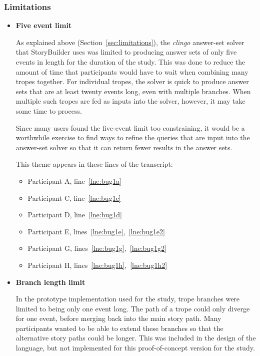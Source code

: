 \documentclass[11pt]{report}
\newcommand{\lref}[1]{\hyperlink{llineno:#1}{\ref*{#1}}}
\begin{document}
\subsubsection{Limitations}
\begin{itemize}
\item \textbf{Five event limit}

As explained above (Section~\ref{sec:limitations}), the \emph{clingo} answer-set solver that StoryBuilder uses
was limited to producing answer sets of only five events in length for the
duration of the study. This was done to reduce the amount of time that
participants would have to wait when combining many tropes together. For
individual tropes, the solver is quick to produce answer sets that are at least
twenty events long, even with multiple branches. When multiple such tropes are
fed as inputs into the solver, however, it may take some time to process.

Since many users found the five-event limit too constraining, it would be a
worthwhile exercise to find ways to refine the queries that are input into the
answer-set solver so that it can return fewer results in the answer sets.

This theme appears in these lines of the transcript:

\begin{itemize}
\item Participant A, line~\lref{lne:bug1a}
\item Participant C, line~\lref{lne:bug1c}
\item Participant D, line~\lref{lne:bug1d}
\item Participant E, lines~\lref{lne:bug1e},~\lref{lne:bug1e2}
\item Participant G, lines~\lref{lne:bug1g},~\lref{lne:bug1g2}
\item Participant H, lines~\lref{lne:bug1h},~\lref{lne:bug1h2}
\end{itemize}

\item \textbf{Branch length limit}

In the prototype implementation used for the study, trope branches were limited
to being only one event long. The path of a trope could only diverge for one
event, before merging back into the main story path. Many participants wanted to
be able to extend these branches so that the alternative story paths could be
longer. This was included in the design of the language, but not implemented for
this proof-of-concept version for the study.


\end{itemize}
\end{document}
